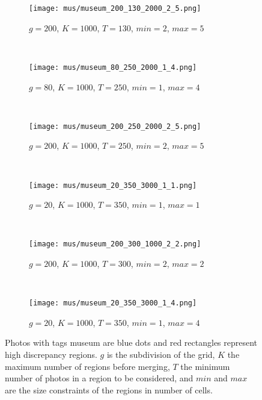 \begin{figure}
        \centering
        \begin{subfigure}[b]{0.5\textwidth}
                \texttt{[image: mus/museum\_200\_130\_2000\_2\_5.png]}
                \caption{$g=200$, $K=1000$, $T=130$, $min=2$, $max=5$}
        \end{subfigure}~
        \begin{subfigure}[b]{0.5\textwidth}
                \texttt{[image: mus/museum\_80\_250\_2000\_1\_4.png]}
                \caption{$g=80$, $K=1000$, $T=250$, $min=1$, $max=4$}
        \end{subfigure}~

        \begin{subfigure}[b]{0.5\textwidth}
                \texttt{[image: mus/museum\_200\_250\_2000\_2\_5.png]}
                \caption{$g=200$, $K=1000$, $T=250$, $min=2$, $max=5$}
        \end{subfigure}~
        \begin{subfigure}[b]{0.5\textwidth}
                \texttt{[image: mus/museum\_20\_350\_3000\_1\_1.png]}
                \caption{$g=20$, $K=1000$, $T=350$, $min=1$, $max=1$}
        \end{subfigure}~

        \begin{subfigure}[b]{0.5\textwidth}
                \texttt{[image: mus/museum\_200\_300\_1000\_2\_2.png]}
                \caption{$g=200$, $K=1000$, $T=300$, $min=2$, $max=2$}
        \end{subfigure}~
        \begin{subfigure}[b]{0.5\textwidth}
                \texttt{[image: mus/museum\_20\_350\_3000\_1\_4.png]}
                \caption{$g=20$, $K=1000$, $T=350$, $min=1$, $max=4$}
        \end{subfigure}
        \caption{Photos with tags \textsf{museum} are blue dots and red
rectangles represent high discrepancy regions. $g$ is the subdivision of the
grid, $K$ the maximum number of regions before merging, $T$ the minimum
number of photos in a region to be considered, and $min$ and $max$ are the
size constraints of the regions in number of cells.\label{f:mus}}
\end{figure}


